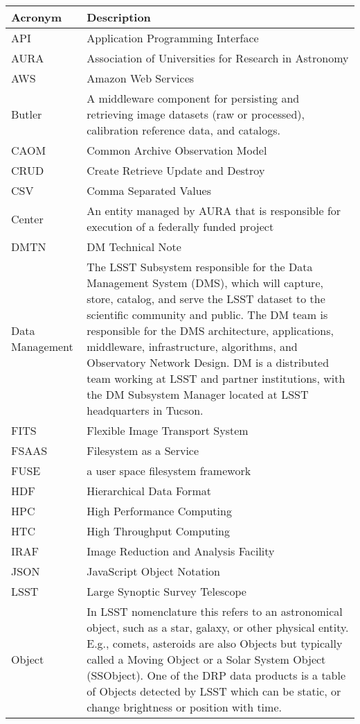 \addtocounter{table}{-1}
\begin{longtable}{|l|p{}|}\hline
\textbf{Acronym} & \textbf{Description}  \\\hline

API & Application Programming Interface \\\hline
AURA & Association of Universities for Research in Astronomy \\\hline
AWS & Amazon Web Services \\\hline
Butler & A middleware component for persisting and retrieving image datasets (raw or processed), calibration reference data, and catalogs. \\\hline
CAOM & Common Archive Observation Model \\\hline
CRUD & Create Retrieve Update and Destroy \\\hline
CSV & Comma Separated Values \\\hline
Center & An entity managed by AURA that is responsible for execution of a federally funded project \\\hline
DMTN & DM Technical Note \\\hline
Data Management & The LSST Subsystem responsible for the Data Management System (DMS), which will capture, store, catalog, and serve the LSST dataset to the scientific community and public. The DM team is responsible for the DMS architecture, applications, middleware, infrastructure, algorithms, and Observatory Network Design. DM is a distributed team working at LSST and partner institutions, with the DM Subsystem Manager located at LSST headquarters in Tucson. \\\hline
FITS & Flexible Image Transport System \\\hline
FSAAS & Filesystem as a Service \\\hline
FUSE & a user space filesystem framework \\\hline
HDF & Hierarchical Data Format \\\hline
HPC & High Performance Computing \\\hline
HTC & High Throughput Computing \\\hline
IRAF & Image Reduction and Analysis Facility \\\hline
JSON & JavaScript Object Notation \\\hline
LSST & Large Synoptic Survey Telescope \\\hline
Object & In LSST nomenclature this refers to an astronomical object, such as a star, galaxy, or other physical entity. E.g., comets, asteroids are also Objects but typically called a Moving Object or a Solar System Object (SSObject). One of the DRP data products is a table of Objects detected by LSST which can be static, or change brightness or position with time. \\\hline

\end{longtable}
